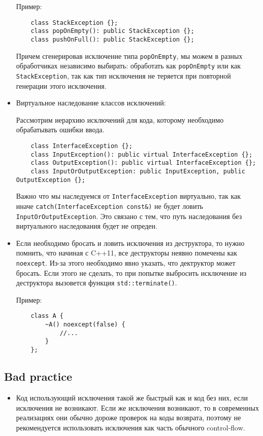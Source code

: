\begin{itemize}
Пример:
\begin{verbatim}
    class StackException {};
    class popOnEmpty(): public StackException {};
    class pushOnFull(): public StackException {};
\end{verbatim}
	Причем сгенерировав исключение типа \texttt{popOnEmpty}, мы можем в разных обработчиках независимо выбирать: обработать как \texttt{popOnEmpty} или как \texttt{StackException}, так как тип исключения не теряется при повторной генерации этого исключения.

\item Виртуальное наследование классов исключений:

Рассмотрим иерархию исключений для кода, которому необходимо обрабатывать ошибки ввода.
\begin{verbatim}
    class InterfaceException {};
    class InputException(): public virtual InterfaceException {};
    class OutputException(): public virtual InterfaceException {};
    class InputOrOutputException: public InputException, public OutputException {};
\end{verbatim}
    Важно что мы наследуемся от \texttt{InterfaceException} виртуально, так как иначе \texttt{catch(InterfaceException const&)} не будет ловить \texttt{InputOrOutputException}. Это связано с тем, что путь наследования без виртуального наследования будет не опреден.

\item
Если необходимо бросать и ловить исключения из деструктора, то нужно помнить, что начиная с C++11, все деструкторы неявно помечены как \texttt{noexcept}. Из-за этого необходимо явно указать, что дектруктор может бросать. Если этого не сделать, то при попытке выбросить исключение из деструктора вызовется функция \texttt{std::terminate()}.

Пример:
\begin{verbatim}
    class A {
        ~A() noexcept(false) {
            //...
        }
    };
\end{verbatim}

\end{itemize}
\subsection{Bad practice}
\begin{itemize}
\item
Код использующий исключения такой же быстрый как и код без них, если исключения не возникают. Если же исключения возникают, то в современных реализациях они обычно дороже проверок на коды возврата, поэтому не рекомендуется использовать исключения как часть обычного control-flow.
\end{itemize}

